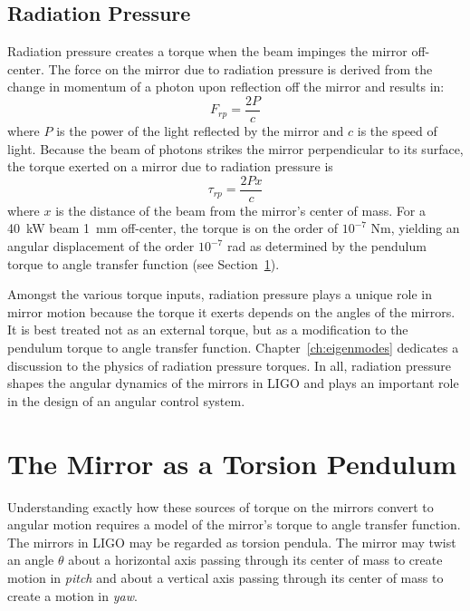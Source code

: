 \subsection{Radiation Pressure} 
\label{sec:rp_intro}
Radiation pressure creates a torque when the beam impinges the mirror
off-center. The force on the mirror due to radiation pressure is
derived from the change in momentum of a photon upon reflection off
the mirror and results in:
\begin{equation}
F_{rp} = \frac{2 P} {c}
\end{equation}
where $P$ is the power of the light reflected by the mirror and $c$ is the
speed of light. Because the beam of photons strikes the mirror
perpendicular to its surface, the torque exerted on a mirror due to
radiation pressure is
\begin{equation}
\tau_{rp} = \frac{2 P x} {c}
\label{eq:tau_rp}
\end{equation}
where $x$ is the distance of the beam from the mirror's center of mass. For a 40~kW beam 1~mm off-center, the torque is on the order of $10^{-7}$ Nm, yielding an angular displacement of the order $10^{-7}$ rad as determined by the pendulum torque to angle transfer function (see Section~\ref{sec:pendTF}).

Amongst the various torque inputs, radiation pressure plays a unique role in mirror motion because the torque it exerts depends on the angles of the mirrors. 
It is best treated not as an external torque, but as a modification to the pendulum torque to angle transfer function. Chapter~\ref{ch:eigenmodes} dedicates a discussion to the physics of radiation pressure torques. In all, radiation pressure shapes the angular dynamics of the mirrors in LIGO and plays an important role in the design of an angular control system.






\section{The Mirror as a Torsion Pendulum}
\label{sec:pendTF}
Understanding exactly how these sources of torque on the mirrors convert to angular motion requires a model of the mirror's torque to angle transfer function.
The mirrors in LIGO may be regarded as torsion pendula. The mirror may twist an angle $\theta$ about a horizontal axis passing through its center of mass to create motion in \emph{pitch} and about a vertical axis passing through its center of mass to create a motion in \emph{yaw}.

